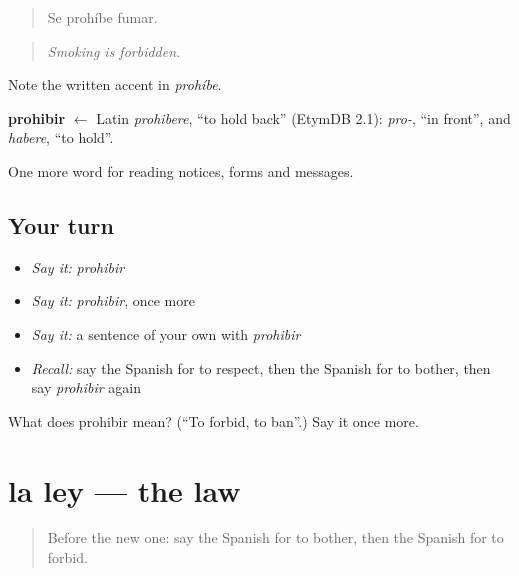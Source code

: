 \begin{quote}
Se prohíbe fumar.
\end{quote}

\begin{quote}
\emph{Smoking is forbidden.}
\end{quote}

Note the written accent in \emph{prohíbe}.

\begin{cousinweb}
\textbf{prohibir} $\leftarrow$ Latin \emph{prohibere}, \textquotedblleft{}to hold back\textquotedblright{} (EtymDB 2.1): \emph{pro-}, \textquotedblleft{}in front\textquotedblright{}, and \emph{habere}, \textquotedblleft{}to hold\textquotedblright{}.
\end{cousinweb}

\begin{grammarlens}[title={What you've built}]
One more word for reading notices, forms and messages.
\end{grammarlens}

\subsection*{Your turn}
\begin{itemize}
\raggedright
  \item \emph{Say it:} \emph{prohibir}
  \item \emph{Say it:} \emph{prohibir}, once more
  \item \emph{Say it:} a sentence of your own with \emph{prohibir}
  \item \emph{Recall:} say the Spanish for to respect, then the Spanish for to bother, then say \emph{prohibir} again
\end{itemize}

\begin{tcolorbox}[breakable,colback=teal!4,colframe=teal!35!black,title={Before you move on}]
What does prohibir mean? (\textquotedblleft{}To forbid, to ban\textquotedblright{}.) Say it once more.
\end{tcolorbox}
\section[la ley]{la ley — the law}

\label{lesson:ES-C500-ley}



\begin{quote}
Before the new one: say the Spanish for to bother, then the Spanish for to forbid.
\end{quote}

